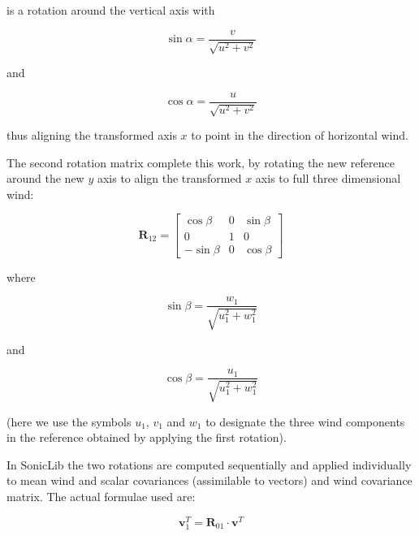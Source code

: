 \documentclass[a4paper,10pt]{book}
\begin{document}
\noindent is a rotation around the vertical axis with

\begin{equation}
 \sin \alpha = \frac{v}{\sqrt{u^2 + v^2}}
\end{equation} 

\noindent and

\begin{equation}
 \cos \alpha = \frac{u}{\sqrt{u^2 + v^2}}
\end{equation} 

\noindent thus aligning the transformed axis $x$ to point in the direction of horizontal wind.

The second rotation matrix complete this work, by rotating the new reference around the new $y$ axis to align the transformed $x$ axis to full three dimensional wind:

\begin{equation}\label{eq:Second rotation in EC}
 \mathbf{R}_{12} = \left[
  \begin{array}{ccc}
    \cos \beta & 0 & \sin \beta \\
         0     & 1 &      0     \\
   -\sin \beta & 0 & \cos \beta
  \end{array}
 \right]
\end{equation}

\noindent where

\begin{equation}
 \sin \beta = \frac{w_{1}}{\sqrt{u^2_{1} + w^2_{1}}}
\end{equation} 

\noindent and

\begin{equation}
 \cos \beta = \frac{u_{1}}{\sqrt{u^2_{1} + w^2_{1}}}
\end{equation} 

\noindent (here we use the symbols $u_{1}$, $v_{1}$ and $w_{1}$ to designate the three wind components in the reference obtained by applying the first rotation).

In SonicLib the two rotations are computed sequentially and applied individually to mean wind and scalar covariances (assimilable to vectors) and wind covariance matrix. The actual formulae used are:

\begin{equation}\label{eq:Transformation of wind speed in the first rotation}
  \mathbf{v}_{1}^{T} = \mathbf{R}_{01} \cdot \mathbf{v}^{T}
\end{equation} 
\end{document}
